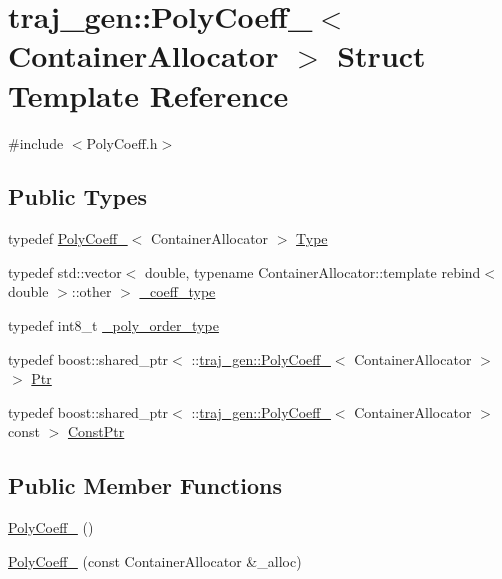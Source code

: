 \hypertarget{structtraj__gen_1_1_poly_coeff__}{}\section{traj\+\_\+gen\+:\+:Poly\+Coeff\+\_\+$<$ Container\+Allocator $>$ Struct Template Reference}
\label{structtraj__gen_1_1_poly_coeff__}


{\ttfamily \#include $<$Poly\+Coeff.\+h$>$}

\subsection*{Public Types}
\begin{DoxyCompactItemize}
\item 
typedef \hyperlink{structtraj__gen_1_1_poly_coeff__}{Poly\+Coeff\+\_\+}$<$ Container\+Allocator $>$ \hyperlink{structtraj__gen_1_1_poly_coeff___a51045d61676deca5abd3f5fedf8219e8}{Type}
\item 
typedef std\+::vector$<$ double, typename Container\+Allocator\+::template rebind$<$ double $>$\+::other $>$ \hyperlink{structtraj__gen_1_1_poly_coeff___a957ab1b353d94d374008e9a073e030f0}{\+\_\+coeff\+\_\+type}
\item 
typedef int8\+\_\+t \hyperlink{structtraj__gen_1_1_poly_coeff___a33d9b89513ff0ce3f0c9085468edbfe6}{\+\_\+poly\+\_\+order\+\_\+type}
\item 
typedef boost\+::shared\+\_\+ptr$<$ \+::\hyperlink{structtraj__gen_1_1_poly_coeff__}{traj\+\_\+gen\+::\+Poly\+Coeff\+\_\+}$<$ Container\+Allocator $>$ $>$ \hyperlink{structtraj__gen_1_1_poly_coeff___a79cb414eeeaedd1f8c1c0472f9912699}{Ptr}
\item 
typedef boost\+::shared\+\_\+ptr$<$ \+::\hyperlink{structtraj__gen_1_1_poly_coeff__}{traj\+\_\+gen\+::\+Poly\+Coeff\+\_\+}$<$ Container\+Allocator $>$ const  $>$ \hyperlink{structtraj__gen_1_1_poly_coeff___a0729b0dcc7df622ea72b75cc06207041}{Const\+Ptr}
\end{DoxyCompactItemize}
\subsection*{Public Member Functions}
\begin{DoxyCompactItemize}
\item 
\hyperlink{structtraj__gen_1_1_poly_coeff___aeecc1aa20fb6c3ffb1a5a5aff1698da5}{Poly\+Coeff\+\_\+} ()
\item 
\hyperlink{structtraj__gen_1_1_poly_coeff___a9c09cb949e4c9fa8be83afd4fb0eaece}{Poly\+Coeff\+\_\+} (const Container\+Allocator \&\+\_\+alloc)
\end{DoxyCompactItemize}
